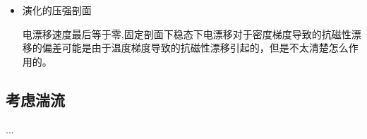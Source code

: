 \documentclass[11pt,a4paper]{article}
\begin{document}
\begin{itemize}
	\item 演化的压强剖面
	\begin{figure}[H]
		\centering
		\caption{}		
	\end{figure}
	电漂移速度最后等于零,固定剖面下稳态下电漂移对于密度梯度导致的抗磁性漂移的偏差可能是由于温度梯度导致的抗磁性漂移引起的，但是不太清楚怎么作用的。
\end{itemize}

\subsection{考虑湍流}

...
\end{document}
